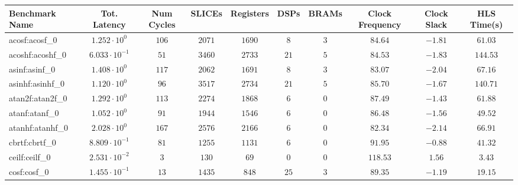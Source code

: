 \begin{tabular}{|l|c|c|c|c|c|c|c|c|c|}
\hline
Benchmark Name               & Tot. Latency            & Num Cycles & SLICEs    & Registers & DSPs    & BRAMs  & Clock Frequency & Clock Slack & HLS Time(s) \\
\hline
acosf:acosf\_0               & $ 1.252 \cdot 10^{0}  $ & $ 106    $ & $ 2071  $ & $ 1690  $ & $ 8   $ & $ 3  $ & $ 84.64       $ & $ -1.81   $ & $ 61.03   $ \\
acoshf:acoshf\_0             & $ 6.033 \cdot 10^{-1} $ & $ 51     $ & $ 3460  $ & $ 2733  $ & $ 21  $ & $ 5  $ & $ 84.53       $ & $ -1.83   $ & $ 144.53  $ \\
asinf:asinf\_0               & $ 1.408 \cdot 10^{0}  $ & $ 117    $ & $ 2062  $ & $ 1691  $ & $ 8   $ & $ 3  $ & $ 83.07       $ & $ -2.04   $ & $ 67.16   $ \\
asinhf:asinhf\_0             & $ 1.120 \cdot 10^{0}  $ & $ 96     $ & $ 3517  $ & $ 2734  $ & $ 21  $ & $ 5  $ & $ 85.70       $ & $ -1.67   $ & $ 140.71  $ \\
atan2f:atan2f\_0             & $ 1.292 \cdot 10^{0}  $ & $ 113    $ & $ 2274  $ & $ 1868  $ & $ 6   $ & $ 0  $ & $ 87.49       $ & $ -1.43   $ & $ 61.88   $ \\
atanf:atanf\_0               & $ 1.052 \cdot 10^{0}  $ & $ 91     $ & $ 1944  $ & $ 1546  $ & $ 6   $ & $ 0  $ & $ 86.48       $ & $ -1.56   $ & $ 49.52   $ \\
atanhf:atanhf\_0             & $ 2.028 \cdot 10^{0}  $ & $ 167    $ & $ 2576  $ & $ 2166  $ & $ 6   $ & $ 0  $ & $ 82.34       $ & $ -2.14   $ & $ 66.91   $ \\
cbrtf:cbrtf\_0               & $ 8.809 \cdot 10^{-1} $ & $ 81     $ & $ 1255  $ & $ 1131  $ & $ 6   $ & $ 0  $ & $ 91.95       $ & $ -0.88   $ & $ 41.32   $ \\
ceilf:ceilf\_0               & $ 2.531 \cdot 10^{-2} $ & $ 3      $ & $ 130   $ & $ 69    $ & $ 0   $ & $ 0  $ & $ 118.53      $ & $ 1.56    $ & $ 3.43    $ \\
cosf:cosf\_0                 & $ 1.455 \cdot 10^{-1} $ & $ 13     $ & $ 1435  $ & $ 848   $ & $ 25  $ & $ 3  $ & $ 89.35       $ & $ -1.19   $ & $ 19.15   $ \\

\end{tabular}
